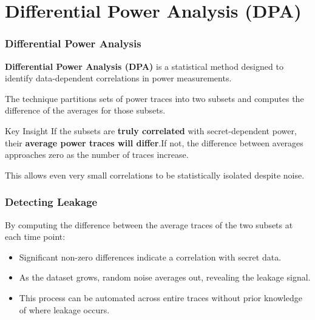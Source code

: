 \section{Differential Power Analysis (DPA)}

\begin{frame}
    \frametitle{Differential Power Analysis }

    \textbf{Differential Power Analysis (DPA)} is a statistical method designed to identify data-dependent correlations in power measurements.

    The technique partitions sets of power traces into two subsets and computes the difference of the averages for those subsets.

    \begin{block}{Key Insight}
         If the subsets are \textbf{truly correlated} with secret-dependent power, their \textbf{average power traces will differ}.\newline If not, the difference between averages approaches zero as the number of traces increase.
    \end{block}

    This allows even very small correlations to be statistically isolated despite noise.
\end{frame}


\begin{frame}
    \frametitle{Detecting Leakage}

    By computing the difference between the average traces of the two subsets at each time point:

    \begin{itemize}
      \item Significant non-zero differences indicate a correlation with secret data.

      \item As the dataset grows, random noise averages out, revealing the leakage signal.

      \item This process can be automated across entire traces without prior knowledge of where leakage occurs.
    \end{itemize}
\end{frame}

